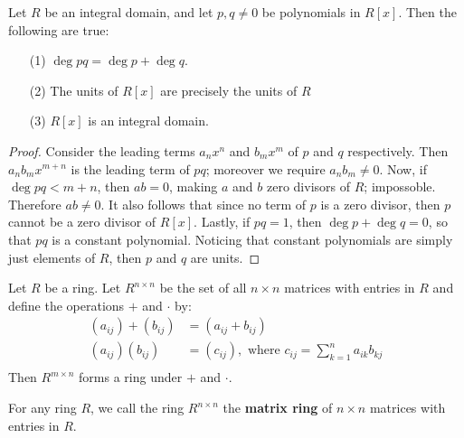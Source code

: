 \begin{theorem}\label{1.2.2}
    Let $R$ be an integral domain, and let  $p,q \neq 0$ be polynomials in
    $R[x]$. Then the following are true:
    \begin{enumerate}
        \item[(1)] $\deg{pq}=\deg{p}+\deg{q}$.

        \item[(2)] The units of $R[x]$ are precisely the units of $R$

        \item[(3)] $R[x]$ is an integral domain.
    \end{enumerate}
\end{theorem}
\begin{proof}
    Consider the leading terms $a_nx^n$ and  $b_mx^m$ of  $p$ and  $q$
    respectively. Then  $a_nb_mx^{m+n}$ is the leading term of $pq$; moreover we
    require $a_nb_m \neq 0$. Now, if $\deg{pq}<m+n$, then $ab=0$, making $a$ and
    $b$ zero divisors of  $R$; impossoble. Therefore  $ab \neq 0$. It also
    follows that since no term of $p$ is a zero divisor, then $p$ cannot be a
    zero divisor of  $R[x]$. Lastly, if $pq=1$, then $\deg{p}+\deg{q}=0$, so
    that $pq$ is a constant polynomial. Noticing that constant polynomials are
    simply just elements of $R$, then $p$ and $q$ are units.
\end{proof}

\begin{theorem}\label{1.2.3}
    Let $R$ be a ring. Let  $R^{n \times n}$ be the set of all $n \times n$
    matrices with entries in $R$ and define the operations $+$ and  $\cdot$ by:
    \begin{align*}
        (a_{ij})+(b_{ij})   &= (a_{ij}+b_{ij})  \\
        (a_{ij})(b_{ij})    &=  (c_{ij}), \text{ where }
        c_{ij}=\sum_{k=1}^n{a_{ik}b_{kj}}   \\
    \end{align*}
    Then $R^{m \times n}$ forms a ring under $+$ and $\cdot$.
\end{theorem}

\begin{definition}
    For any ring $R$, we call the ring  $R^{n \times n}$ the  \textbf{matrix
    ring} of $n \times n$ matrices with entries in $R$.
\end{definition}

